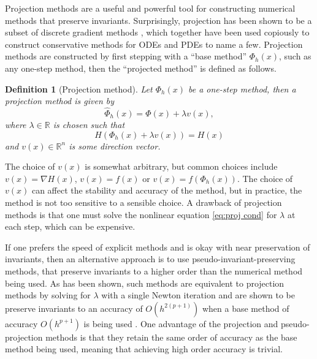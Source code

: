 \documentclass[final,3p,times]{elsarticle}
\newtheorem{definition}[theorem]{Definition}
\newcommand{\R}{\mathbb{R}}
\begin{document}
Projection methods are a useful and powerful tool for constructing numerical methods that preserve invariants. Surprisingly, projection has been shown to be a subset of discrete gradient methods \cite{norton2015discrete}, which together have been used copiously to construct conservative methods for ODEs and PDEs \cite{dahlby2011general, calvo2006preservation, kojima2016invariants, jiang2021explicit} to name a few. Projection methods are constructed by first stepping with a ``base method'' $\Phi_h(x)$, such as any one-step method, then the ``projected method'' is defined as follows. 
\begin{definition}[Projection method]\label{def:projection method}
  Let $\Phi_h(x)$ be a one-step method, then a projection method is given by
\begin{equation}\label{eq:proj method}
  \widehat{\Phi}_h(x) =  \Phi(x) + \lambda v(x),
\end{equation}
where $\lambda\in\R$ is chosen such that 
\begin{equation}\label{eq:proj cond}
  H(\Phi_h(x) + \lambda v(x)) = H(x)
\end{equation}
 and $v(x)\in\R^n$ is some direction vector.
\end{definition}  
The choice of $v(x)$ is somewhat arbitrary, but common choices include $v(x) = \nabla H(x)$, $v(x) = f(x)$ or $v(x) = f(\Phi_h(x))$. The choice of $v(x)$ can affect the stability and accuracy of the method, but in practice, the method is not too sensitive to a sensible choice. A drawback of projection methods is that one must solve the nonlinear equation \eqref{eq:proj cond} for $\lambda$ at each step, which can be expensive. 

If one prefers the speed of explicit methods and is okay with near preservation of invariants, then an alternative approach is to use pseudo-invariant-preserving methods, that preserve invariants to a higher order than the numerical method being used. As has been shown, such methods are equivalent to projection methods by solving for $\lambda$ with a single Newton iteration and are shown to be preserve invariants to an accuracy of $O(h^{2(p+1)})$ when a base method of accuracy $O(h^{p+1})$ is being used \cite{cai2020explicit}. One advantage of the projection and pseudo-projection methods is that they retain the same order of accuracy as the base method being used, meaning that achieving high order accuracy is trivial.
\end{document}
